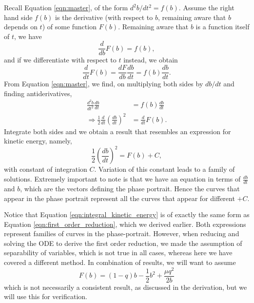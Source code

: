 \documentclass{article}
\begin{document}
Recall Equation \ref{eqn:master}, of the form $d^2b/dt^2 = f(b)$.
Assume the right hand side $f(b)$ is the derivative (with respect to $b$, remaining aware that $b$ depends on $t$) of some function $F(b)$.
Remaining aware that $b$ is a function itself of $t$, we have
\begin{equation}
    \frac{d}{db}F(b) = f(b),
\end{equation}
and if we differentiate with respect to $t$ instead, we obtain
\begin{equation}
    \frac{d}{dt}F(b) = \frac{dF}{db}\frac{db}{dt} = f(b)\frac{db}{dt}.
\end{equation}
From Equation \ref{eqn:master}, we find, on multiplying both sides by $db/dt$ and finding antiderivatives,
\begin{align}
    \frac{d^2b}{dt^2} \frac{db}{dt}                                   & = f(b) \frac{db}{dt} \\
    \Rightarrow \frac{1}{2}\frac{d}{dt}\left( \frac{db}{dt} \right)^2 & = \frac{d}{dt}F(b).
\end{align}
Integrate both sides and we obtain a result that resembles an expression for kinetic energy, namely,
\begin{equation}
    \frac{1}{2}\left(\frac{db}{dt}\right)^2 = F(b) + C,
    \label{eqn:integral_kinetic_energy}
\end{equation}
with constant of integration $C$. Variation of this constant leads to a family of solutions.
Extremely important to note is that we have an equation in terms of $\frac{db}{dt}$ and $b$, which are the vectors defining the phase portrait.
Hence the curves that appear in the phase portrait represent all the curves that appear for different $+C$.


Notice that Equation \ref{eqn:integral_kinetic_energy} is of exactly the same form as Equation \ref{eqn:first_order_reduction},
which we derived earlier.
Both expressions represent families of curves in the phase-portrait.
However, when reducing and solving the ODE to derive the first order reduction, we made the assumption of separability of variables,
which is not true in all cases,
whereas here we have covered a different method.
In combination of results, we will want to assume
\begin{equation}
    F(b) = (1-q)b - \frac{1}{2}b^2 + \frac{\mu q^2}{2b}
    \label{eqn:integral_curve_supposed}
\end{equation}
which is not necessarily a consistent result, as discussed in the derivation, but we will use this for verification.
\end{document}
